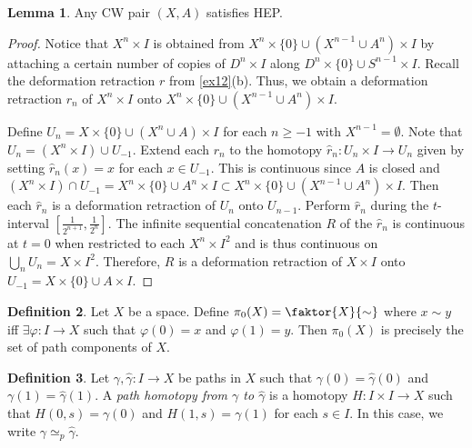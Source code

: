 \documentclass[10pt,letterpaper,cm]{nupset}
\theoremstyle{definition}
\newtheorem{definition}{Definition}[subsection]
\theoremstyle{theorem}
\newtheorem{lemma}[definition]{Lemma}
\theoremstyle{remark}
\newcommand{\1}{\mathbb{1}}
\newcommand{\0}{\vec 0}
\begin{document}
\begin{lemma}
Any CW pair $(X,A)$ satisfies HEP.
\end{lemma}
\begin{proof}
Notice that $X^n \times I$ is obtained from $X^n \times \{0\} \cup (X^{n-1} \cup A^n) \times I$ by attaching a certain number of copies of $D^n \times I$ along $D^n \times \{0\} \cup S^{n-1} \times I$. Recall the deformation retraction $r$ from  \cref{ex12}(b). Thus, we obtain a deformation retraction $r_n$ of $X^n \times I$ onto $X^n \times \{0\} \cup (X^{n-1} \cup A^n) \times I$.

Define $U_n = X\times \{0\} \cup (X^n \cup A) \times I$ for each $n\geq -1$ with $X^{n-1} = \emptyset$. Note that $U_n = (X^n \times I) \cup U_{-1}$. Extend each $r_n$ to the homotopy $\hat{r}_n : U_n \times I \to U_n$ given by setting $\hat{r}_n(x) = x$ for each $x\in U_{-1}$. This is continuous since $A$ is closed and $(X^n \times I) \cap U_{-1} = X^n \times \{0\} \cup A^n \times I \subset X^n \times \{0\} \cup (X^{n-1} \cup A^n) \times I$. Then each $\hat{r}_n$ is a deformation retraction of $U_n$ onto $U_{n-1}$.  Perform $\hat{r}_n$ during the $t$-interval $[\frac{1}{2^{n+1}}, \frac{1}{2^n}]$.  The infinite sequential concatenation $R$ of the $\hat{r}_n$ is continuous at $t=0$ when restricted to each $X^n \times I^2$  and is thus continuous on $\bigcup_n U_n = X \times I^2$. Therefore, $R$ is a deformation retraction of $X\times I$ onto $U_{-1} = X\times \{0\} \cup A\times I$.
\end{proof}

\begin{definition}
Let $X$ be a space. Define $\pi_0(X) = \faktor{X}{\sim} $ where $x\sim y$ iff $\exists \varphi: I \to X$ such that $\varphi(0)=x$ and $\varphi(1) = y$. Then $\pi_0(X)$ is precisely the set of path components of $X$.
\end{definition}

\begin{definition}
Let $\gamma, \hat{\gamma}: I \to X$ be paths in $X$ such that $\gamma(0) = \hat{\gamma}(0)$ and $\gamma(1) = \hat{\gamma}(1)$.  A \textit{path homotopy from $\gamma$ to $\hat{\gamma}$} is a homotopy $H: I \times I \to X$ such that $H(0,s) = \gamma(0)$ and $H(1,s) = \gamma(1)$ for each $s\in I$. In this case, we write $\gamma \simeq_p \hat{\gamma}$.
\end{definition}
\end{document}
